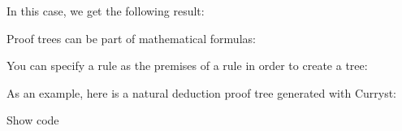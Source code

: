 In this case, we get the following result:

\pandocbounded{}

Proof trees can be part of mathematical formulas:

\begin{Shaded}
\begin{Highlighting}[]
\NormalTok{$}
\NormalTok{    )}
\NormalTok{  )}
\NormalTok{$}
\end{Highlighting}
\end{Shaded}

\pandocbounded{}

You can specify a rule as the premises of a rule in order to create a
tree:

\begin{Shaded}
\begin{Highlighting}[]
\NormalTok{      ),}
\NormalTok{    ),}
\NormalTok{    ),}
\NormalTok{  )}
\NormalTok{)}
\end{Highlighting}
\end{Shaded}

\pandocbounded{}

As an example, here is a natural deduction proof tree generated with
Curryst:

\pandocbounded{}

Show code

